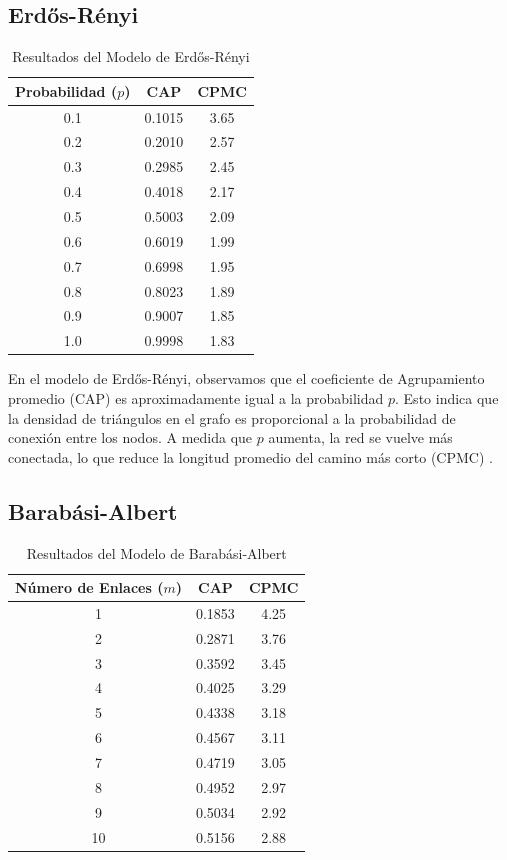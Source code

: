 \subsection{Erdős-Rényi}
\begin{table}[h!]
\centering
\begin{tabular}{ccc}
\toprule
Probabilidad ($p$) & CAP & CPMC \\
\midrule
0.1 & 0.1015 & 3.65 \\
0.2 & 0.2010 & 2.57 \\
0.3 & 0.2985 & 2.45 \\
0.4 & 0.4018 & 2.17 \\
0.5 & 0.5003 & 2.09 \\
0.6 & 0.6019 & 1.99 \\
0.7 & 0.6998 & 1.95 \\
0.8 & 0.8023 & 1.89 \\
0.9 & 0.9007 & 1.85 \\
1.0 & 0.9998 & 1.83 \\
\bottomrule
\end{tabular}
\caption{Resultados del Modelo de Erdős-Rényi}
\label{tab:erdos-renyi}
\end{table}

En el modelo de Erdős-Rényi, observamos que el coeficiente de Agrupamiento promedio (CAP) es aproximadamente igual a la probabilidad $p$. Esto indica que la densidad de triángulos en el grafo es proporcional a la probabilidad de conexión entre los nodos. A medida que $p$ aumenta, la red se vuelve más conectada, lo que reduce la longitud promedio del camino más corto (CPMC) .

\newpage
\subsection{Barabási-Albert}

\begin{table}[h!]
\centering
\begin{tabular}{ccc}
\toprule
Número de Enlaces ($m$) & CAP & CPMC \\
\midrule
1 & 0.1853 & 4.25 \\
2 & 0.2871 & 3.76 \\
3 & 0.3592 & 3.45 \\
4 & 0.4025 & 3.29 \\
5 & 0.4338 & 3.18 \\
6 & 0.4567 & 3.11 \\
7 & 0.4719 & 3.05 \\
8 & 0.4952 & 2.97 \\
9 & 0.5034 & 2.92 \\
10 & 0.5156 & 2.88 \\
\bottomrule
\end{tabular}
\caption{Resultados del Modelo de Barabási-Albert}
\label{tab:barabasi-albert}
\end{table}


